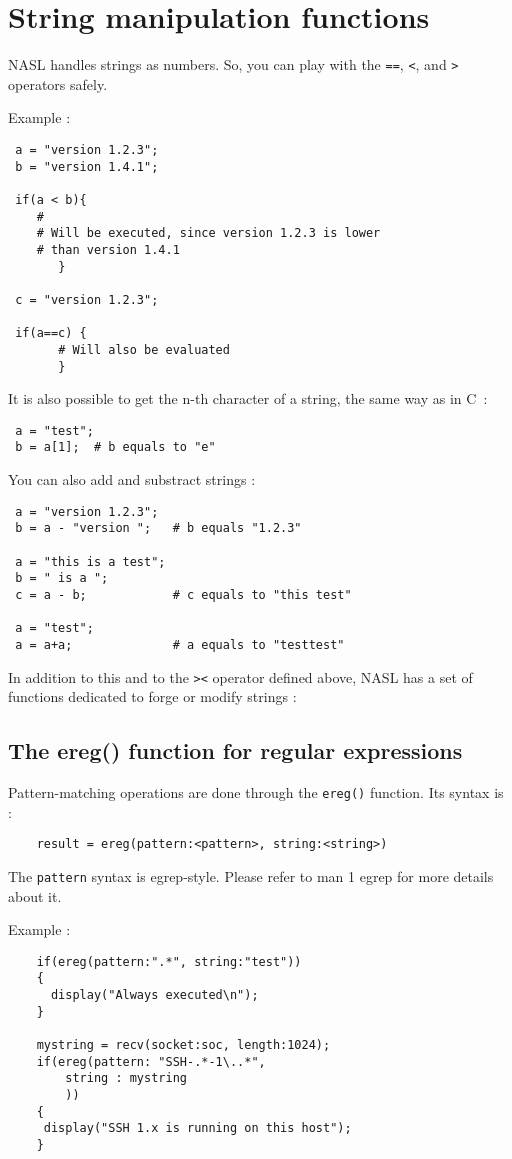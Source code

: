 \documentclass{article}
\begin{document}
		

	


\newpage
\section{String manipulation functions}

NASL handles strings as numbers. So, you can play with the \verb+==+,
\verb+<+, and \verb+>+ operators safely.

Example :
\begin{verbatim}
 a = "version 1.2.3";
 b = "version 1.4.1";
 
 if(a < b){
 	#
	# Will be executed, since version 1.2.3 is lower
	# than version 1.4.1
       }
       
 c = "version 1.2.3";
 
 if(a==c) {
       # Will also be evaluated
       }
\end{verbatim}

It is also possible to get the n-th character of a string, the same way as 
in C~:
\begin{verbatim}
 a = "test";
 b = a[1];  # b equals to "e"
\end{verbatim}

You can also add and substract strings :
\begin{verbatim}
 a = "version 1.2.3";
 b = a - "version ";   # b equals "1.2.3"
 
 a = "this is a test";
 b = " is a ";
 c = a - b;            # c equals to "this test"
 
 a = "test";
 a = a+a;              # a equals to "testtest"
\end{verbatim}
In addition to this and to the \verb+><+ operator defined above, NASL has a set of
functions dedicated to forge or modify strings :

\subsection{The ereg() function for regular expressions}

Pattern-matching operations are done through the \verb+ereg()+ function. Its
syntax is :
\begin{verbatim}
	result = ereg(pattern:<pattern>, string:<string>)
\end{verbatim}

The \verb+pattern+ syntax is egrep-style. Please refer to man 1 egrep
for more details about it.

Example :
\begin{verbatim}
	if(ereg(pattern:".*", string:"test"))
	{
	  display("Always executed\n");
	}
	
	mystring = recv(socket:soc, length:1024);
	if(ereg(pattern: "SSH-.*-1\..*", 
		string : mystring
		))
	{
	 display("SSH 1.x is running on this host");
	}
	
	
\end{verbatim}
\end{document}
